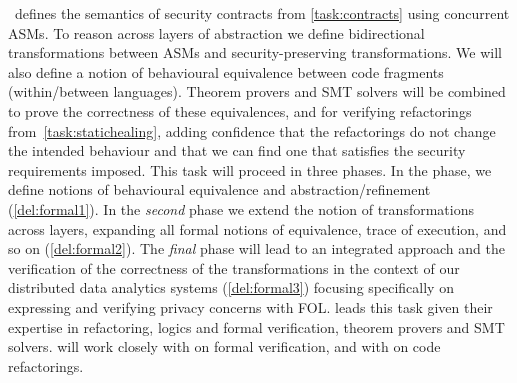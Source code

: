 \begin{Workpackage}{\thewpno}
\begin{Task}
\theTask\ defines the semantics of security contracts from \ref{task:contracts} using concurrent ASMs. To reason across layers of abstraction we define %
 bidirectional transformations between ASMs %
and security-preserving transformations. We will also define a notion of behavioural equivalence between code fragments (within/between languages). Theorem provers and SMT solvers will be combined to prove the correctness of these equivalences, and for verifying refactorings
from~\ref{task:statichealing}, adding confidence that the refactorings do not change the intended behaviour and 
\taskbreak 
that we can find one that satisfies the security requirements imposed. 
This task will proceed in three phases. In the  phase, we define notions of behavioural equivalence and abstraction/refinement 
(\ref{del:formal1}). In the \emph{second} phase we extend the notion of transformations across layers, expanding all formal notions of equivalence, trace of execution, and so on
(\ref{del:formal2}). The \emph{final} phase will lead to an integrated approach and the verification of the correctness of the transformations in the context of our distributed data analytics systems (\ref{del:formal3}) focusing specifically on expressing and verifying privacy concerns with FOL.
\SA leads this task given their expertise in refactoring, logics and formal verification, theorem provers and SMT solvers. 
\SA will work closely with \SCCHshort on formal verification, and with \UCM on code refactorings.

\end{Task}


\end{Workpackage}
